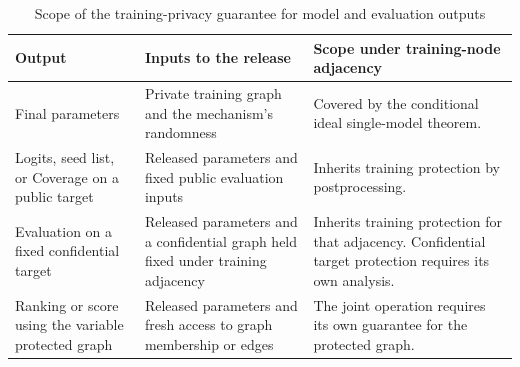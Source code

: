 \begin{table}[htbp]
\centering
\small
\caption{Scope of the training-privacy guarantee for model and evaluation outputs}
\label{tab:release-scope}
\begin{tabularx}{\textwidth}{@{}p{}XX@{}}
\toprule
Output & Inputs to the release & Scope under training-node adjacency \\
\midrule
Final parameters & Private training graph and the mechanism's randomness & Covered by the conditional ideal single-model theorem. \\
Logits, seed list, or Coverage on a public target & Released parameters and fixed public evaluation inputs & Inherits training protection by postprocessing. \\
Evaluation on a fixed confidential target & Released parameters and a confidential graph held fixed under training adjacency & Inherits training protection for that adjacency. Confidential target protection requires its own analysis. \\
Ranking or score using the variable protected graph & Released parameters and fresh access to graph membership or edges & The joint operation requires its own guarantee for the protected graph. \\
\bottomrule
\end{tabularx}
\end{table}
